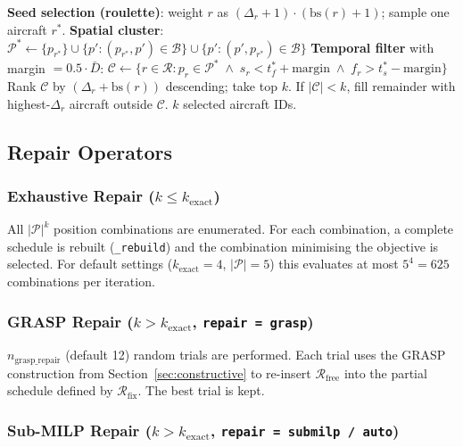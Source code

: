 \begin{algorithm}[H]
\caption{Space-Time Cluster Destroy}
\begin{algorithmic}[1]
\State \textbf{Seed selection (roulette)}:
    weight $r$ as $(\Delta_r + 1) \cdot (\text{bs}(r) + 1)$;
    sample one aircraft $r^*$.
\State \textbf{Spatial cluster}:
    $\mathcal{P}^* \leftarrow \{p_{r^*}\}
    \cup \{p' : (p_{r^*}, p') \in \mathcal{B}\}
    \cup \{p' : (p', p_{r^*}) \in \mathcal{B}\}$
\State \textbf{Temporal filter} with margin $= 0.5 \cdot \bar{D}$:
    $\mathcal{C} \leftarrow \{r \in \mathcal{R}
    : p_r \in \mathcal{P}^*
    \;\wedge\; s_r < t_{f}^* + \text{margin}
    \;\wedge\; f_r > t_{s}^* - \text{margin}\}$
\State Rank $\mathcal{C}$ by $(\Delta_r + \text{bs}(r))$ descending; take top $k$.
\State If $|\mathcal{C}| < k$, fill remainder with highest-$\Delta_r$ aircraft outside $\mathcal{C}$.
\State \Return $k$ selected aircraft IDs.
\end{algorithmic}
\end{algorithm}

\subsection{Repair Operators}

\subsubsection{Exhaustive Repair ($k \leq k_{\text{exact}}$)}

All $|\mathcal{P}|^k$ position combinations are enumerated.  For each
combination, a complete schedule is rebuilt (\texttt{\_rebuild}) and the
combination minimising the objective is selected.  For default settings
($k_{\text{exact}} = 4$, $|\mathcal{P}| = 5$) this evaluates at most
$5^4 = 625$ combinations per iteration.

\subsubsection{GRASP Repair ($k > k_{\text{exact}}$, \texttt{repair = grasp})}

$n_{\text{grasp\_repair}}$ (default 12) random trials are performed.  Each
trial uses the GRASP construction from Section~\ref{sec:constructive} to
re-insert $\mathcal{R}_{\text{free}}$ into the partial schedule defined by
$\mathcal{R}_{\text{fix}}$.  The best trial is kept.

\subsubsection{Sub-MILP Repair ($k > k_{\text{exact}}$, \texttt{repair = submilp / auto})}
\label{sec:lns-submilp}

